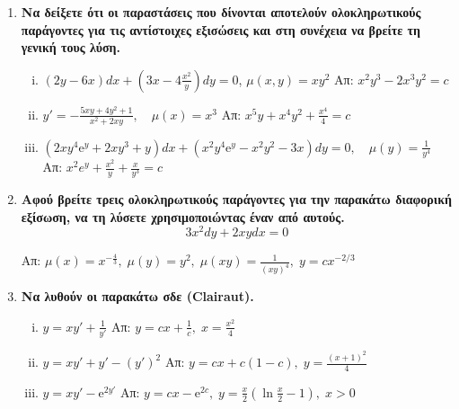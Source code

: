 \begin{enumerate}
  \item {\bfseries Να δείξετε ότι οι παραστάσεις που δίνονται αποτελούν ολοκληρωτικούς 
      παράγοντες για τις αντίστοιχες εξισώσεις και στη συνέχεια να βρείτε τη γενική 
    τους λύση.}
    \begin{enumerate}[i)]
      \item $ (2y-6x)dx+\left(3x-4\frac{x^{2}}{y}\right)dy=0 $, \; $ \mu (x,y) = 
        xy^{2} $
        \hfill Απ: $ x^{2}y^{3}-2x^{3}y^{2}=c $ %
      \item $ y' =- \frac{5xy+4y^{2}+1}{x^{2}+2xy}, \quad \mu(x)=x^{3} $  
        \hfill Απ: $ x^{5}y+x^{4}y^{2} + \frac{x^{4}}{4} = c $ 
      \item $ (2xy^{4} \mathrm{e}^{y} + 2xy^{3}+y)dx + (x^{2}y^{4}\mathrm{e}^{y} -
        x^{2}y^{2}-3x)dy=0, \quad \mu (y) = \frac{1}{y^{4}} $ 
        \hfill Απ: $ x^{2}e^{y}+ \frac{x^{2}}{y} + \frac{x}{y^{3}} =c $ 
    \end{enumerate}

  \item {\bfseries Αφού βρείτε τρεις ολοκληρωτικούς παράγοντες για την 
    παρακάτω διαφορική εξίσωση, να τη λύσετε χρησιμοποιώντας έναν από αυτούς.}
    \[
      3x^{2}dy+2xydx=0 
    \] 

    \hfill Απ:  $ \mu (x) = x^{-\frac{4}{3}}, \; \mu (y) = y^{2}, \; \mu (xy) =
    \frac{1}{(xy)^{4}}, \; y=cx^{-2/3} $

  \item \textbf{Να λυθούν οι παρακάτω σδε (Clairaut).} 
    \begin{enumerate}[i)]
      \item $ y = xy' + \frac{1}{y'} $ \hfill Απ: $ y=cx+ \frac{1}{c}, \; x =
        \frac{x^{2}}{4} $ 
      \item $ y = xy' + y' - (y')^{2} $ \hfill Απ: $ y=cx+c(1-c), \; y=
        \frac{(x+1)^{2}}{4} $ 
      \item $ y=xy'- \mathrm{e}^{2y'} $ \hfill Απ: $ y=cx- \mathrm{e}^{2c}, \; y =
        \frac{x}{2} (\ln{\frac{x}{2}} -1), \; x>0 $ 
    \end{enumerate}
\end{enumerate}


